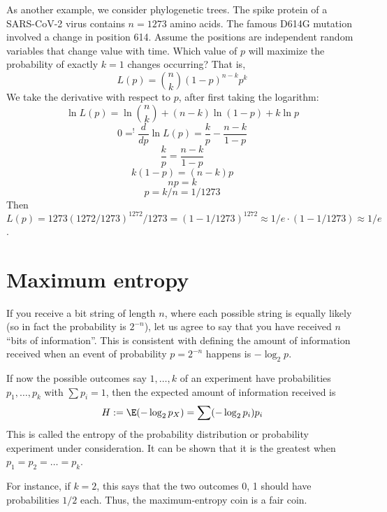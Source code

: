 As another example, we consider phylogenetic trees.
The spike protein of a SARS-CoV-2 virus contains $n=1273$ amino acids.
The famous D614G mutation involved a change in position 614.
Assume the positions are independent random variables that change value with time.
Which value of $p$ will maximize the probability of exactly $k=1$ changes occurring? That is,
\[
	L(p) = \binom{n}{k} (1-p)^{n-k}p^k
\]
We take the derivative with respect to $p$, after first taking the logarithm:
\[
	\ln L(p) = \ln \binom{n}{k} + (n-k)\ln(1-p) + k\ln p
\]
\[
	0 =^! \frac{d}{dp}\ln L(p) = \frac{k}p - \frac{n-k}{1-p}
\]
\[
	\frac{k}p = \frac{n-k}{1-p}
\]
\[
	k(1-p)=(n-k)p
\]
\[
	np = k 
\]
\[
	p = k/n = 1/1273
\]
Then $L(p)=1273 (1272/1273)^{1272}/1273 = (1-1/1273)^{1272}\approx 1/e\cdot (1-1/1273)\approx 1/e$.



\section{Maximum entropy}\label{maxEnt}



If you receive a bit string of length $n$, where each possible string is equally likely (so in fact the probability is $2^{-n}$), let us agree to say that you have received $n$ ``bits of information''.
This is consistent with defining the amount of information received when an event of probability $p=2^{-n}$ happens is $-\log_2 p$.

If now the possible outcomes say $1,\dots,k$ of an experiment have probabilities $p_1,\dots,p_k$ with $\sum p_i=1$, then the expected amount of information received is
\[
	H := \E(-\log_2 p_X) = \sum (-\log_2 p_i)p_i
\]
This is called the entropy of the probability distribution or probability experiment under consideration. It can be shown that it is the greatest when $p_1=p_2=\dots =p_k$.

For instance, if $k=2$, this says that the two outcomes 0, 1 should have probabilities $1/2$ each. Thus, the maximum-entropy coin is a fair coin.


